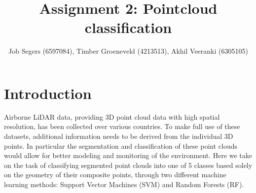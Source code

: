 \documentclass[a4paper,11pt]{scrartcl}
\title{\vspace{-2cm} Assignment 2: Pointcloud classification}
\author{Job Segers (6597084), Timber Groeneveld (4213513), Akhil Veeranki (6305105)}
\date{\vspace{-0.5cm}}
\begin{document}
\maketitle

\vspace{-1.2cm}
\section{Introduction}
Airborne LiDAR data, providing 3D point cloud data with high spatial resolution, has been collected over various countries. To make full use of these datasets, additional information needs to be derived from the individual 3D points. In particular the segmentation and classification of these point clouds would allow for better modeling and monitoring of the environment. Here we take on the task of classifying segmented point clouds into one of 5 classes based solely on the geometry of their composite points, through two different machine learning methods: Support Vector Machines (SVM) and Random Forests (RF). 
\end{document}
